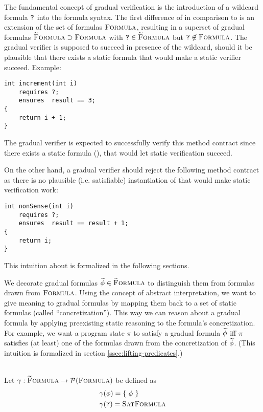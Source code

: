 
The fundamental concept of gradual verification is the introduction of a wildcard formula $\textup{\texttt{?}}$ into the formula syntax.
The first difference of \gvl in comparison to \svl is an extension of the set of formulas $\textup{\textsc{Formula}}$, resulting in a superset of gradual formulas $\textup{\textsc{\ensuremath{\widetilde{\text{F}}}ormula}} \supset \textup{\textsc{Formula}}$ with $\textup{\texttt{?}} \in \textup{\textsc{\ensuremath{\widetilde{\text{F}}}ormula}}$ but $\textup{\texttt{?}} \not \in \textup{\textsc{Formula}}$.
The gradual verifier is supposed to succeed in presence of the wildcard, should it be plausible that there exists a static formula that would make a static verifier succeed.
Example:
\begin{lstlisting}
int increment(int i)
    requires ?;
    ensures  result == 3;
{
    return i + 1;
}
\end{lstlisting}
The gradual verifier is expected to successfully verify this method contract since there exists a static formula (), that would let static verification succeed.

On the other hand, a gradual verifier should reject the following method contract as there is no plausible (i.e. satisfiable) instantiation of \qm that would make static verification work:
\begin{lstlisting}
int nonSense(int i)
    requires ?;
    ensures  result == result + 1;
{
    return i;
}
\end{lstlisting}

This intuition about \qm is formalized in the following sections.

We decorate gradual formulas $\widetilde{\phi} \in \textup{\textsc{\ensuremath{\widetilde{\text{F}}}ormula}}$ to distinguish them from formulas drawn from $\textup{\textsc{Formula}}$.
Using the concept of abstract interpretation, we want to give meaning to gradual formulas by mapping them back to a set of static formulas (called “concretization”).
This way we can reason about a gradual formula by applying preexisting static reasoning to the formula's concretization.
For example, we want a program state $\pi$ to satisfy a gradual formula $\widetilde{\phi}$ iff $\pi$ satisfies (at least) one of the formulas drawn from the concretization of $\widetilde{\phi}$.
(This intuition is formalized in section \ref{ssec:lifting-predicates}.)

\begin{definition}[Concretization]~\\
    Let $\gamma : \textup{\textsc{\ensuremath{\widetilde{\text{F}}}ormula}} \rightarrow \mathcal{P}(\textup{\textsc{Formula}})$ be defined as
    \begin{align*}
    &\gamma(\phi) = \{~ \phi ~\} \\
    &\gamma(\textup{\texttt{?}}) = \textup{\textsc{SatFormula}}
    \end{align*}
\end{definition}

